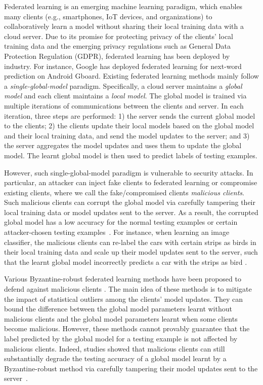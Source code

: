 \documentclass[letterpaper]{article} %
\begin{document}
Federated learning \cite{konevcny2016federated,mcmahan2016communication} is an emerging machine learning paradigm, which enables many clients (e.g., smartphones, IoT devices, and organizations) to collaboratively learn a model without sharing their local training data with a cloud server. Due to its promise for protecting privacy of the clients' local training data and the emerging privacy regulations such as General Data Protection Regulation (GDPR), federated learning has been deployed by industry. For instance, Google has deployed  federated learning for next-word prediction on Android Gboard.  Existing federated learning methods mainly follow a \emph{single-global-model} paradigm.  Specifically, a cloud server maintains a \emph{global model} and each client maintains a \emph{local model}.  The global model is trained via multiple iterations of communications between the clients and server. In each iteration, three steps are performed: 1) the server sends the current global model to the clients; 2) the clients update their local models based on the global model and their local training data, and send the model updates to the server; and 3) the server aggregates the model updates and uses them to update the global model. The learnt global model is then used to predict labels of testing examples.

However, such single-global-model paradigm is vulnerable to security attacks. In particular, an attacker can inject fake clients to federated learning or compromise existing clients, where we call the fake/compromised clients \emph{malicious clients}. Such malicious clients can corrupt the global model via carefully tampering their local training data or model updates sent to the server. As a result, the corrupted global model has a low accuracy for the normal testing examples \cite{fang2019local,Xie19} or certain attacker-chosen testing examples~\cite{Bagdasaryan18,Bhagoji19,xie2019dba}. For instance, when learning an image classifier, the malicious clients can re-label the cars with certain strips as birds in their local training data and scale up their model updates sent to the server, such that the learnt global model incorrectly predicts a car with the strips as bird \cite{Bagdasaryan18}. 

Various Byzantine-robust federated learning methods have been proposed to defend against malicious clients \cite{Blanchard17,ChenPOMACS17,Mhamdi18,Yin18,yin2019defending,chen2018draco,alistarh2018byzantine}. The main idea of these methods  is to mitigate the impact of statistical outliers among the clients' model updates. They can bound the difference between the global model parameters learnt without malicious clients and the global model parameters learnt when some clients become malicious. However, these methods cannot provably guarantee that the label predicted by the global model for a testing example is not affected by malicious clients. Indeed, studies showed that malicious clients can still substantially degrade the testing accuracy of a global model learnt by a Byzantine-robust method via carefully tampering their model updates sent to the server~\cite{Bhagoji19,fang2019local,Xie19}. 
\end{document}
